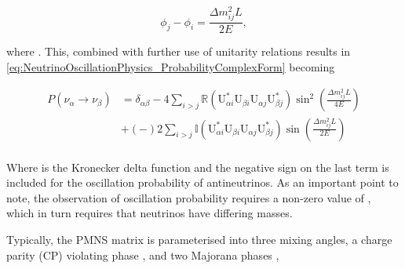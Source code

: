 \begin{equation}
  \phi_{j}-\phi_{i} = \frac{\Delta m^{2}_{ij} L}{2E},
\end{equation}

where . This, combined with further use of unitarity relations results in \autoref{eq:NeutrinoOscillationPhysics_ProbabilityComplexForm} becoming

\begin{equation}
  \label{eq:NeutrinoOscillationPhysics_ProbabilityComplexForm2}
  \begin{split}
    P(\nu_{\alpha} \rightarrow \nu_{\beta}) &= \delta_{\alpha \beta} - 4 \sum_{i>j} \mathbb{R} \left( \mathrm{U}^{*}_{\alpha i}\mathrm{U}_{\beta i}\mathrm{U}_{\alpha j}\mathrm{U}^{*}_{\beta j} \right) \sin^{2} \left( \frac{\Delta m^{2}_{ij} L}{4E} \right) \\
    & + \left( - \right) 2 \sum_{i>j} \mathbb{I} \left( \mathrm{U}^{*}_{\alpha i}\mathrm{U}_{\beta i}\mathrm{U}_{\alpha j}\mathrm{U}^{*}_{\beta j} \right) \sin \left( \frac{\Delta m^{2}_{ij} L}{2E} \right) \\
    \end{split}
\end{equation}

Where \quickmath{\delta_{\alpha \beta}} is the Kronecker delta function and the negative sign on the last term is included for the oscillation probability of antineutrinos. As an important point to note, the observation of oscillation probability requires a non-zero value of , which in turn requires that neutrinos have differing masses.

Typically, the PMNS matrix is parameterised into three mixing angles, a charge parity (CP) violating phase , and two Majorana phases ,

